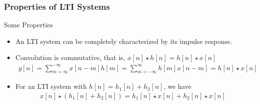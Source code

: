 \documentclass[mathserif,9pt,handout]{beamer}
\begin{document}
\begin{frame}\frametitle{Properties of LTI Systems}\small

  \begin{exampleblock}{Some Properties}
  \begin{itemize}
    \item An LTI system can be completely characterized by its impulse response.  
    \item Convolution is commutative, that is, $x[n] \star h[n] = h[n] \star x[n]$
      \begin{align}
        y[n] = \sum_{m=\infty}^{-\infty}{x[n-m]h[m]} = \sum_{m=-\infty}^{\infty}{h[m]x[n-m]} = h[n] \star x[n]
        \nonumber
      \end{align}
    \item For an LTI system with $h[n] = h_1[n] + h_2[n]$, we have
      \begin{align}
        x[n] \star \left( h_1[n] + h_2[n] \right) = h_1[n] \star x[n] + h_2[n] \star x[n]
        \nonumber
      \end{align}
  \end{itemize}
  \end{exampleblock}
\end{frame}
\end{document}
